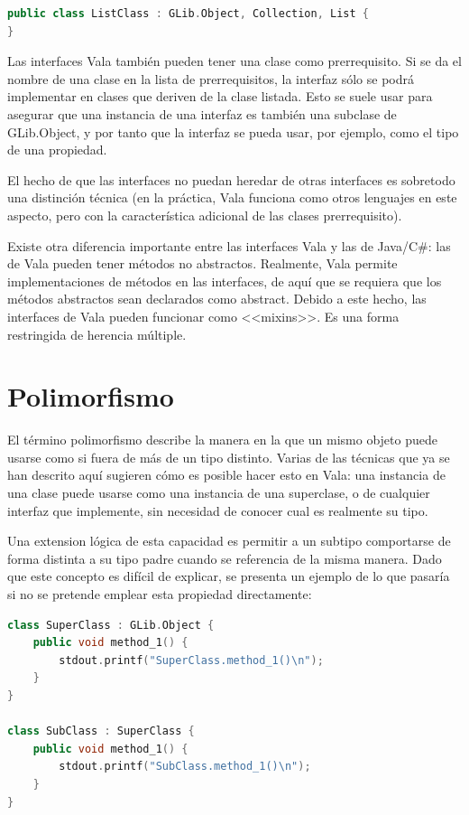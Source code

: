 \documentclass[12pt,twoside]{book}
\begin{document}
\begin{lstlisting}[language=C++]
public class ListClass : GLib.Object, Collection, List {
}
\end{lstlisting}

Las interfaces Vala también pueden tener una clase como prerrequisito. Si se da el nombre de una clase en la lista de prerrequisitos, la interfaz sólo se podrá implementar en clases que deriven de la clase listada. Esto se suele usar para asegurar que una instancia de una interfaz es también una subclase de GLib.Object, y por tanto que la interfaz se pueda usar, por ejemplo, como el tipo de una propiedad.

El hecho de que las interfaces no puedan heredar de otras interfaces es sobretodo una distinción técnica (en la práctica, Vala funciona como otros lenguajes en este aspecto, pero con la característica adicional de las clases prerrequisito).

Existe otra diferencia importante entre las interfaces Vala y las de Java/C\#: las de Vala pueden tener métodos no abstractos. Realmente, Vala permite implementaciones de métodos en las interfaces, de aquí que se requiera que los métodos abstractos sean declarados como abstract. Debido a este hecho, las interfaces de Vala pueden funcionar como <<mixins>>. Es una forma restringida de herencia múltiple.




\section{Polimorfismo}

El término polimorfismo describe la manera en la que un mismo objeto puede usarse como si fuera de más de un tipo distinto. Varias de las técnicas que ya se han descrito aquí sugieren cómo es posible hacer esto en Vala: una instancia de una clase puede usarse como una instancia de una superclase, o de cualquier interfaz que implemente, sin necesidad de conocer cual es realmente su tipo.

Una extension lógica de esta capacidad es permitir a un subtipo comportarse de forma distinta a su tipo padre cuando se referencia de la misma manera. Dado que este concepto es difícil de explicar, se presenta un ejemplo de lo que pasaría si no se pretende emplear esta propiedad directamente:


\begin{lstlisting}[language=C++]
class SuperClass : GLib.Object {
	public void method_1() {
		stdout.printf("SuperClass.method_1()\n");
	}
}

class SubClass : SuperClass {
	public void method_1() {
		stdout.printf("SubClass.method_1()\n");
	}
}
\end{lstlisting}
\end{document}
